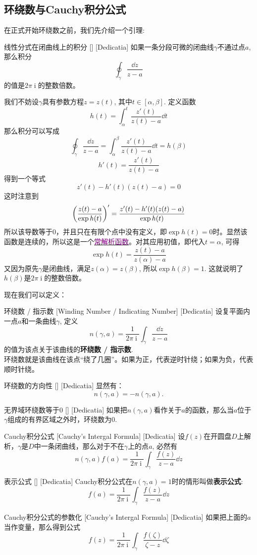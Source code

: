 \documentclass[UTF8]{ctexart}
\newcommand{\hyperrefc}[2]{\hyperref[#1]{\textcolor{purple}{#2}}}
\DeclareMathOperator{\ii}{\mathrm{i}}
\begin{document}
\subsection{环绕数与Cauchy积分公式}
在正式开始环绕数之前，我们先介绍一个引理:
\begin{lma}
    [UUID]
    {线性分式在闭曲线上的积分}
    []
    [Dedicatia]
    如果一条分段可微的闭曲线$\gamma$不通过点$a$, 那么积分
    \[\oint_\gamma\frac{\dd{z}}{z-a} \]
    的值是$2\pi\ii$的整数倍数。
\end{lma}
\begin{prf}
    我们不妨设$\gamma$具有参数方程$z=z(t)$, 其中$t\in[\alpha,\beta]$. 定义函数
    \[h(t)=\int_\alpha^t \frac{z'(t)}{z(t)-a}\dd{t}\]
    那么积分可以写成
    \[\oint_\gamma\frac{\dd{z}}{z-a}=\int_\alpha^\beta \frac{z'(t)}{z(t)-a}\dd{t}=h(\beta)\]
    \[h'(t)=\frac{z'(t)}{z(t)-a}\]
    得到一个等式
    \[z'(t)-h'(t)(z(t)-a)=0\]
    这时注意到
    \[\pqty{\frac{z(t)-a}{\exp h(t)}}'=\frac{z'(t)-h'(t)(z(t)-a)}{\exp h(t)}\]
    所以该导数等于0，并且只在有限个点中没有定义，即$\exp h(t)=0$时。显然该函数是连续的，所以这是一个\hyperrefc{dfn:TrivialAnalyticalFunction}{常解析函数}。对其应用初值，即代入$t=\alpha$, 可得
    \[\exp h(t)=\frac{z(t)-a}{z(\alpha)-a}\]
    又因为原先$\gamma$是闭曲线，满足$z(\alpha)=z(\beta)$, 所以$\exp h(\beta)=1$. 这就说明了$h(\beta)$是$2\pi\ii$的整数倍数。
\end{prf}
现在我们可以定义：
\begin{dfn}
    [UUID]
    {环绕数 / 指示数\label{dfn:WindingNumber}}
    [Winding Number / Indicating Number]
    [Dedicatia]
    设复平面内一点$a$和一条曲线$\gamma$, 定义
    \[n(\gamma, a)=\frac{1}{2\pi\ii}\int_\gamma\frac{\dd{z}}{z-a}\]
    的值为该点关于该曲线的\textbf{环绕数 / 指示数}.\\
    环绕数就是该曲线在该点“绕了几圈”。如果为正，代表逆时针绕；如果为负，代表顺时针绕。
\end{dfn}
\begin{ppt}
    [UUID]
    {环绕数的方向性}
    []
    [Dedicatia]
    显然有：
    \[n(\gamma,a)=-n(\gamma,a).\]
\end{ppt}
\begin{ppt}
    [UUID]
    {无界域环绕数等于0}
    []
    [Dedicatia]
    如果把$n(\gamma,a)$看作关于$a$的函数，那么当$a$位于$\gamma$组成的有界区域之外时，环绕数为0.
\end{ppt}
\begin{thm}
    [UUID]
    {Cauchy积分公式}
    [Cauchy's Intergal Formula]
    [Dedicatia]
    设$f(z)$在开圆盘$D$上解析，$\gamma$是$D$中一条闭曲线，那么对于不在$\gamma$上的点$a$, 必然有
    \[n(\gamma,a)f(a)=\frac{1}{2\pi\ii}\int_\gamma\frac{f(z)}{z-a}\dd{z} \]
\end{thm}
\begin{crl}
    [UUID]
    {表示公式\label{crl:CauchyRepresenting}}
    []
    [Dedicatia]
    Cauchy积分公式在$n(\gamma,a)=1$时的情形叫做\textbf{表示公式}:
    \[f(a)=\frac{1}{2\pi\ii}\int_\gamma\frac{f(z)}{z-a}\dd{z}\]
\end{crl}
\begin{crl}
    [UUID]
    {Cauchy积分公式的参数化}
    [Cauchy's Intergal Formula]
    [Dedicatia]
    如果把上面的$a$当作变量，那么得到公式
    \[f(z)=\frac{1}{2\pi\ii}\int_\gamma\frac{f(\zeta)}{\zeta-z}\dd{\zeta}\]
\end{crl}
\end{document}
